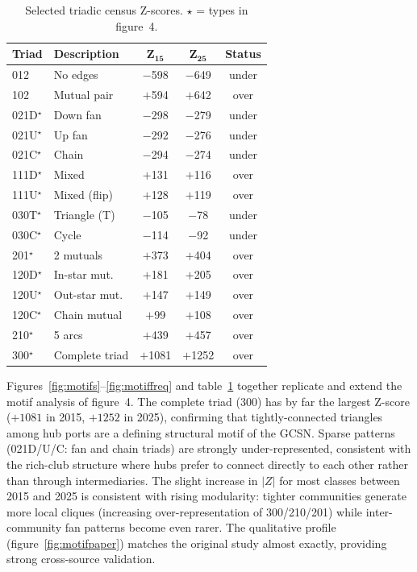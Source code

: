 \documentclass[a4paper,10pt,twocolumn]{article}
\begin{document}
\begin{table}[t]
\centering
\caption{Selected triadic census Z-scores.
  $\star$ = types in \citet{Kaluza2010} figure~4.}
\label{tab:motifs}
{\small
\begin{tabular}{@{}llccc@{}}
\toprule
\rowcolor{TableH}
\textbf{Triad} & \textbf{Description} &
$\boldsymbol{Z_{15}}$ & $\boldsymbol{Z_{25}}$ & \textbf{Status} \\
\midrule
012            & No edges        & $-$598  & $-$649  & under \\
102            & Mutual pair     & $+$594  & $+$642  & over  \\
021D$^\star$   & Down fan        & $-$298  & $-$279  & under \\
021U$^\star$   & Up fan          & $-$292  & $-$276  & under \\
021C$^\star$   & Chain           & $-$294  & $-$274  & under \\
111D$^\star$   & Mixed           & $+$131  & $+$116  & over  \\
111U$^\star$   & Mixed (flip)    & $+$128  & $+$119  & over  \\
030T$^\star$   & Triangle (T)    & $-$105  & $-$78   & under \\
030C$^\star$   & Cycle           & $-$114  & $-$92   & under \\
201$^\star$    & 2 mutuals       & $+$373  & $+$404  & over  \\
120D$^\star$   & In-star mut.    & $+$181  & $+$205  & over  \\
120U$^\star$   & Out-star mut.   & $+$147  & $+$149  & over  \\
120C$^\star$   & Chain mutual    & $+$99   & $+$108  & over  \\
210$^\star$    & 5 arcs          & $+$439  & $+$457  & over  \\
300$^\star$    & Complete triad  & $+$1081 & $+$1252 & over  \\
\bottomrule
\end{tabular}}
\end{table}

Figures~\ref{fig:motifs}--\ref{fig:motiffreq} and
table~\ref{tab:motifs} together replicate and extend the motif
analysis of \citet{Kaluza2010} figure~4.
The complete triad (300) has by far the largest Z-score
($+1081$ in 2015, $+1252$ in 2025), confirming that
tightly-connected triangles among hub ports are a defining structural
motif of the GCSN.
Sparse patterns (021D/U/C: fan and chain triads) are strongly
under-represented, consistent with the rich-club structure where
hubs prefer to connect directly to each other rather than through
intermediaries.
The slight increase in $|Z|$ for most classes between 2015 and
2025 is consistent with rising modularity: tighter communities
generate more local cliques (increasing over-representation of
300/210/201) while inter-community fan patterns become even rarer.
The qualitative profile (figure~\ref{fig:motifpaper}) matches the
original study almost exactly, providing strong cross-source
validation.
\end{document}

